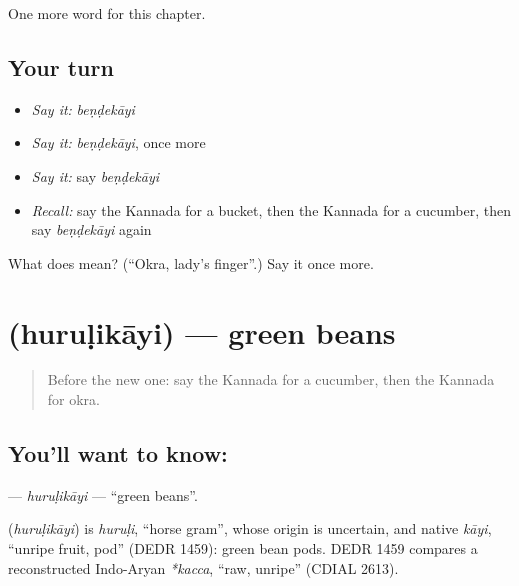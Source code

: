 \begin{grammarlens}[title={What you've built}]
One more word for this chapter.
\end{grammarlens}

\subsection*{Your turn}
\begin{itemize}
\raggedright
  \item \emph{Say it:} \emph{beṇḍekāyi}
  \item \emph{Say it:} \emph{beṇḍekāyi}, once more
  \item \emph{Say it:} say \emph{beṇḍekāyi}
  \item \emph{Recall:} say the Kannada for a bucket, then the Kannada for a cucumber, then say \emph{beṇḍekāyi} again
\end{itemize}

\begin{tcolorbox}[breakable,colback=teal!4,colframe=teal!35!black,title={Before you move on}]
What does  mean? (\textquotedblleft{}Okra, lady's finger\textquotedblright{}.) Say it once more.
\end{tcolorbox}
\section[\texorpdfstring{\kn{ಹುರುಳಿಕಾಯಿ} (huruḷikāyi)}{ಹುರುಳಿಕಾಯಿ (huruḷikāyi)}]{ (huruḷikāyi) — green beans}

\label{lesson:KA-C184-hurulikayi}



\begin{quote}
Before the new one: say the Kannada for a cucumber, then the Kannada for okra.
\end{quote}

\subsection*{You'll want to know: }
\textbf{} — \emph{huruḷikāyi} — \textquotedblleft{}green beans\textquotedblright{}.

\begin{cousinweb}
\textbf{} (\emph{huruḷikāyi}) is \emph{huruḷi}, \textquotedblleft{}horse gram\textquotedblright{}, whose origin is uncertain, and native \emph{kāyi}, \textquotedblleft{}unripe fruit, pod\textquotedblright{} (DEDR 1459): green bean pods. DEDR 1459 compares a reconstructed Indo-Aryan \emph{*kacca}, \textquotedblleft{}raw, unripe\textquotedblright{} (CDIAL 2613).
\end{cousinweb}

